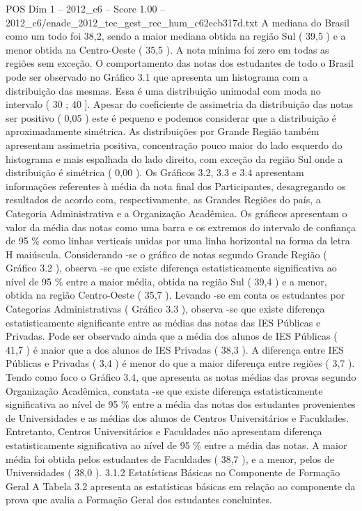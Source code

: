 \begin{textsample}{POS Dim 1 – 2012\_c6 – Score 1.00 – 2012\_c6/enade\_2012\_tec\_gest\_rec\_hum\_c62ecb317d.txt}
A mediana do Brasil como um todo foi 38,2, sendo a maior mediana obtida na região Sul ( 39,5 ) e a menor obtida na Centro-Oeste ( 35,5 ).
A nota mínima foi zero em todas as regiões sem exceção.
O comportamento das notas dos estudantes de todo o Brasil pode ser observado no Gráfico 3.1 que apresenta um histograma com a distribuição das mesmas.
Essa é uma distribuição unimodal com moda no intervalo ( 30 ; 40 ].
Apesar do coeficiente de assimetria da distribuição das notas ser positivo ( 0,05 ) este é pequeno e podemos considerar que a distribuição é aproximadamente simétrica.
As distribuições por Grande Região também apresentam assimetria positiva, concentração pouco maior do lado esquerdo do histograma e mais espalhada do lado direito, com exceção da região Sul onde a distribuição é simétrica ( 0,00 ).
Os Gráficos 3.2, 3.3 e 3.4 apresentam informações referentes à média da nota final dos Participantes, desagregando os resultados de acordo com, respectivamente, as Grandes Regiões do país, a Categoria Administrativa e a Organização Acadêmica.
Os gráficos apresentam o valor da média das notas como uma barra e os extremos do intervalo de confiança de 95 \% como linhas verticais unidas por uma linha horizontal na forma da letra H maiúscula.
Considerando -se o gráfico de notas segundo Grande Região ( Gráfico 3.2 ), observa -se que existe diferença estatisticamente significativa ao nível de 95 \% entre a maior média, obtida na região Sul ( 39,4 ) e a menor, obtida na região Centro-Oeste ( 35,7 ).
Levando -se em conta os estudantes por Categorias Administrativas ( Gráfico 3.3 ), observa -se que existe diferença estatisticamente significante entre as médias das notas das IES Públicas e Privadas.
Pode ser observado ainda que a média dos alunos de IES Públicas ( 41,7 ) é maior que a dos alunos de IES Privadas ( 38,3 ).
A diferença entre IES Públicas e Privadas ( 3,4 ) é menor do que a maior diferença entre regiões ( 3,7 ).
Tendo como foco o Gráfico 3.4, que apresenta as notas médias das provas segundo Organização Acadêmica, constata -se que existe diferença estatisticamente significativa ao nível de 95 \% entre a média das notas dos estudantes provenientes de Universidades e as médias dos alunos de Centros Universitários e Faculdades.
Entretanto, Centros Universitários e Faculdades não apresentam diferença estatisticamente significativa ao nível de 95 \% entre a média das notas.
A maior média foi obtida pelos estudantes de Faculdades ( 38,7 ), e a menor, pelos de Universidades ( 38,0 ). 3.1.2 Estatísticas Básicas no Componente de Formação Geral A Tabela 3.2 apresenta as estatísticas básicas em relação ao componente da prova que avalia a Formação Geral dos estudantes concluintes.

\end{textsample}
